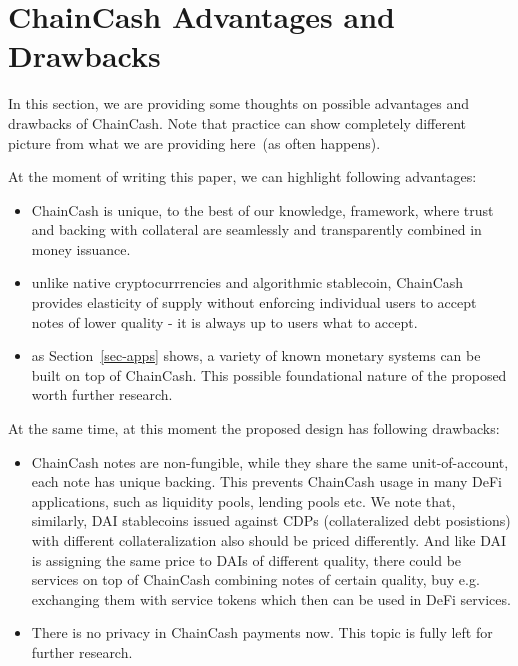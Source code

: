 \documentclass{llncs}   %
\newcommand{\cc}{ChainCash}
\begin{document}
\section{\cc{} Advantages and Drawbacks}
\label{sec-adv}

In this section, we are providing some thoughts on possible advantages and drawbacks of \cc{}. Note that practice can show
completely different picture from what we are providing here~(as often happens).


At the moment of writing this paper, we can highlight following advantages:
\begin{itemize}
  \item ChainCash is unique, to the best of our knowledge, framework, where trust and backing with collateral are
   seamlessly and transparently combined in money issuance.
  \item unlike native cryptocurrrencies and algorithmic stablecoin, \cc{} provides elasticity of supply without enforcing
  individual users to accept notes of lower quality - it is always up to users what to accept.
  \item as Section~\ref{sec-apps} shows, a variety of known monetary systems can be built on top of \cc{}. This possible
  foundational nature of the proposed worth further research.
\end{itemize}

At the same time, at this moment the proposed design has following drawbacks:
\begin{itemize}
  \item ChainCash notes are non-fungible, while they share the same unit-of-account, each note has unique backing. This prevents ChainCash usage
  in many DeFi applications, such as liquidity pools, lending pools etc. We note that, similarly, DAI stablecoins issued against CDPs
  (collateralized debt posistions) with different collateralization also should be priced differently. And like DAI is assigning the same price to
  DAIs of different quality, there could be services on top of \cc{} combining notes of certain quality, buy e.g. exchanging them with service tokens
  which then can be used in DeFi services.
  \item There is no privacy in \cc{} payments now. This topic is fully left for further research.
\end{itemize}


\newpage

 
\end{document}
